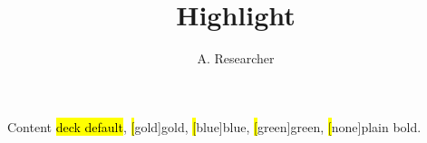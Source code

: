 \documentclass{beamer}
\title{Highlight}
\author{A. Researcher}
\begin{document}
{
\begin{frame}[plain]\titlepage\end{frame}
}
\begin{frame}{Content}
\hl{deck default}, \hl[gold]{gold}, \hl[blue]{blue}, \hl[green]{green},
\hl[none]{plain bold}.
\end{frame}
\end{document}
